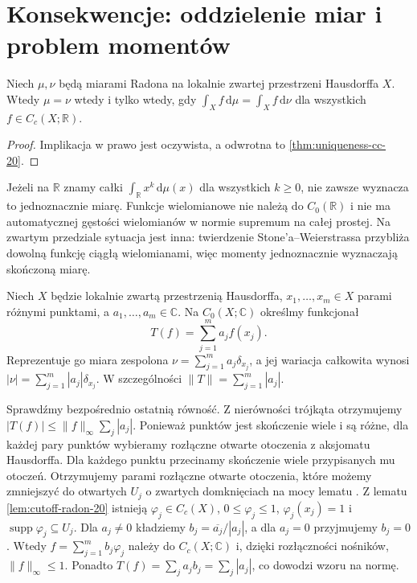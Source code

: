 \section{Konsekwencje: oddzielenie miar i problem momentów}
\begin{wniosek}
\label{cor:measures-separate-21}
Niech $\mu,\nu$ będą miarami Radona na lokalnie zwartej
przestrzeni Hausdorffa $X$. Wtedy
$\mu=\nu$ wtedy i tylko wtedy, gdy
$\int_Xf\,\mathrm d\mu=\int_Xf\,\mathrm d\nu$
dla wszystkich $f\in C_c(X;\mathbb R)$.
\end{wniosek}
\begin{proof}
Implikacja w prawo jest oczywista, a odwrotna to
\ref{thm:uniqueness-cc-20}.
\end{proof}

\begin{uwaga}
Jeżeli na $\mathbb R$ znamy całki
$\int_{\mathbb R}x^k\,\mathrm d\mu(x)$ dla wszystkich
$k\ge0$, nie zawsze wyznacza to jednoznacznie miarę.
Funkcje wielomianowe nie należą do $C_0(\mathbb R)$
i nie ma automatycznej gęstości wielomianów w normie
supremum na całej prostej. Na zwartym przedziale
sytuacja jest inna: twierdzenie Stone'a--Weierstrassa
przybliża dowolną funkcję ciągłą wielomianami,
więc momenty jednoznacznie wyznaczają skończoną miarę.
\end{uwaga}

\begin{przyklad}
\label{ex:riesz-complex-atoms-21}
Niech $X$ będzie lokalnie zwartą przestrzenią Hausdorffa,
$x_1,\ldots,x_m\in X$ parami różnymi punktami,
a $a_1,\ldots,a_m\in\mathbb C$. Na $C_0(X;\mathbb C)$
określmy funkcjonał
\[
 T(f)=\sum_{j=1}^ma_jf(x_j).
\]
Reprezentuje go miara zespolona
$\nu=\sum_{j=1}^ma_j\delta_{x_j}$, a jej wariacja
całkowita wynosi
$|\nu|=\sum_{j=1}^m|a_j|\delta_{x_j}$.
W szczególności
$\|T\|=\sum_{j=1}^m|a_j|$.

Sprawdźmy bezpośrednio ostatnią równość. Z nierówności
trójkąta otrzymujemy
$|T(f)|\le\|f\|_\infty\sum_j|a_j|$.
Ponieważ punktów jest skończenie wiele i są różne,
dla każdej pary punktów wybieramy rozłączne otwarte
otoczenia z aksjomatu Hausdorffa. Dla każdego punktu
przecinamy skończenie wiele przypisanych mu otoczeń.
Otrzymujemy parami rozłączne otwarte otoczenia, które
możemy zmniejszyć do otwartych $U_j$ o zwartych domknięciach
na mocy lematu . Z lematu
\ref{lem:cutoff-radon-20} istnieją
$\varphi_j\in C_c(X)$, $0\le\varphi_j\le1$,
$\varphi_j(x_j)=1$ i
$\operatorname{supp}\varphi_j\subseteq U_j$.
Dla $a_j\ne0$ kładziemy
$b_j=\overline{a_j}/|a_j|$, a dla $a_j=0$
przyjmujemy $b_j=0$. Wtedy
$f=\sum_{j=1}^m b_j\varphi_j$ należy do
$C_c(X;\mathbb C)$ i, dzięki rozłączności nośników,
$\|f\|_\infty\le1$. Ponadto
$T(f)=\sum_j a_jb_j=\sum_j|a_j|$,
co dowodzi wzoru na normę.
\end{przyklad}

